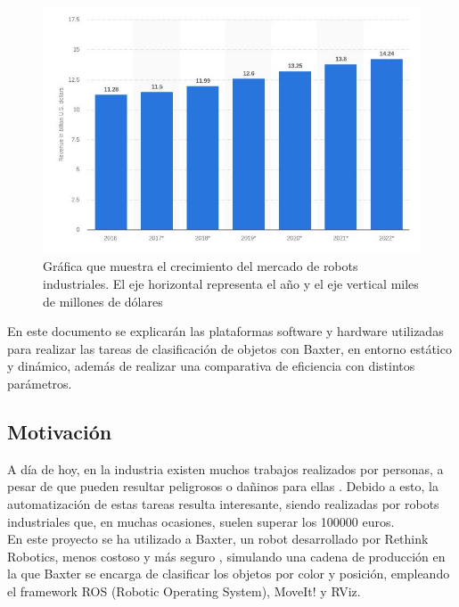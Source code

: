 \begin{figure}[H]
	\centering %
	\includegraphics[scale=0.5]{imagenes/robmarket.jpg}
	\caption{Gráfica que muestra el crecimiento del mercado de robots industriales\cite{robgraph}. El eje horizontal representa el año y el eje vertical miles de millones de dólares}
\end{figure}

\noindent En este documento se explicarán las plataformas software y hardware utilizadas para realizar las tareas de clasificación de objetos con Baxter, en entorno estático y dinámico, además de realizar una comparativa de eficiencia con distintos parámetros. \\

\subsection{Motivación}
\noindent A día de hoy, en la industria existen muchos trabajos realizados por personas, a pesar de que pueden resultar peligrosos o dañinos para ellas \cite{lasota2014toward}. Debido a esto, la automatización de estas tareas resulta interesante, siendo realizadas por robots industriales que, en muchas ocasiones, suelen superar los 100000 euros.\\

\noindent En este proyecto se ha utilizado a Baxter, un robot desarrollado por Rethink Robotics, menos costoso y más seguro \cite{ju2014kinematics}, simulando una cadena de producción en la que Baxter se encarga de clasificar los objetos por color y posición, empleando el framework ROS (Robotic Operating System), MoveIt! y RViz. \\

